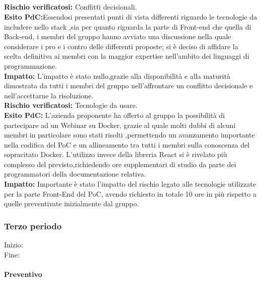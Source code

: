 \subparagraph{}
\textbf{Rischio verificatosi:} Conflitti decisionali.\\
\textbf{Esito PdC:}Essendosi presentati punti di vista differenti riguardo le tecnologie da includere
nello stack ,sia per quanto riguarda la parte di Front-end  che quella di Back-end, i membri del gruppo 
hanno avviato una discussione nella quale considerare i pro e i contro delle differenti proposte; si è deciso di 
affidare la scelta definitiva ai membri con la maggior expertise nell'ambito dei linguaggi di programmazione.\\
\textbf{Impatto:} L'impatto è stato nullo,grazie alla disponibilità e alla maturità dimostrata da tutti i membri del gruppo
nell'affrontare un conflitto decisionale e  nell'accettarne la risoluzione.  \\

\textbf{Rischio verificatosi:} Tecnologie da usare.\\
\textbf{Esito PdC:} L'azienda proponente ha offerto al gruppo la possibilità di partecipare ad un Webinar
su Docker, grazie al quale molti dubbi di alcuni membri in particolare sono stati risolti ,permettendo un avanzamento 
importante nella codifica del PoC e un allineamento tra tutti i membri sulla conoscenza del sopracitato Docker.
L'utilizzo invece della libreria React si è rivelato più complesso del previsto,richiedendo ore supplementari di studio
da parte dei programmatori della documentazione relativa.\\
\textbf{Impatto:} Importante è stato l'impatto del rischio legato alle tecnologie utilizzate per la parte Front-End del PoC,
avendo richiesto in totale 10 ore in più rispetto a quelle preventivate inizialmente dal gruppo.\\

\subsubsection{Terzo periodo}
Inizio: \\
Fine: 
\paragraph{Preventivo}

